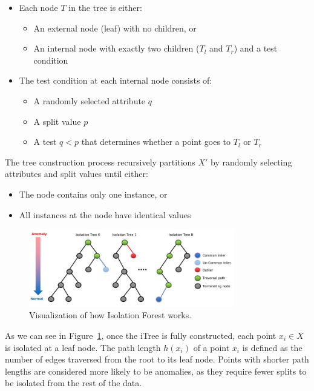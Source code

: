 \documentclass[11pt,english,a4paper,hidelinks]{book}
\begin{document}
\begin{itemize}
    \item Each node $T$ in the tree is either:
    \begin{itemize}
        \item An external node (leaf) with no children, or
        \item An internal node with exactly two children ($T_l$ and $T_r$) and a test condition
    \end{itemize}
    \item The test condition at each internal node consists of:
    \begin{itemize}
        \item A randomly selected attribute $q$
        \item A split value $p$
        \item A test $q < p$ that determines whether a point goes to $T_l$ or $T_r$
    \end{itemize}
\end{itemize}

\noindent The tree construction process recursively partitions $X'$ by randomly selecting attributes and split values until either:
\begin{itemize}
    \item The node contains only one instance, or
    \item All instances at the node have identical values
\end{itemize}
\begin{figure}[H]
    \centering
    \includegraphics[width=0.8\textwidth]{images/code/outliers/IF.jpeg}
    \caption{Visualization of how Isolation Forest works.}
    \label{fig:isolation_forest}
\end{figure}

\noindent As we can see in Figure~\ref{fig:isolation_forest}, once the iTree is fully constructed, each point $x_i \in X$ is isolated at a leaf node. The path length $h(x_i)$ of a point $x_i$ is defined as the number of edges traversed from the root to its leaf node. Points with shorter path lengths are considered more likely to be anomalies, as they require fewer splits to be isolated from the rest of the data.
\end{document}
